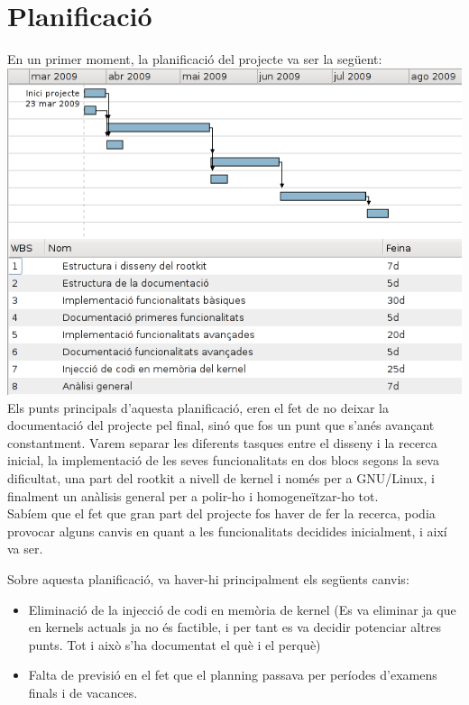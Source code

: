 \chapter{Planificació}

En un primer moment, la planificació del projecte va ser la següent: \\

\includegraphics[scale=0.7,keepaspectratio]{primer_gantt.png} \\

Els punts principals d'aquesta planificació, eren el fet de no deixar la documentació del projecte pel final, 
sinó que fos un punt que s'anés avançant constantment. Varem separar les diferents tasques entre el disseny
i la recerca inicial, la implementació de les seves funcionalitats en dos blocs segons la seva dificultat,
una part del rootkit a nivell de kernel i només per a GNU/Linux, i finalment un anàlisis general per a polir-ho
i homogeneïtzar-ho tot. \\

Sabíem que el fet que gran part del projecte fos haver de fer la recerca, podia provocar alguns canvis en quant a
les funcionalitats decidides inicialment, i així va ser.

Sobre aquesta planificació, va haver-hi principalment els següents canvis:

\begin{itemize}
    \item Eliminació de la injecció de codi en memòria de kernel (Es va eliminar ja que en kernels actuals ja no 
        és factible, i per tant es va decidir potenciar altres punts. Tot i això s'ha documentat el què i el perquè)
    \item Falta de previsió en el fet que el planning passava per períodes d'examens finals i de vacances.
\end{itemize}

